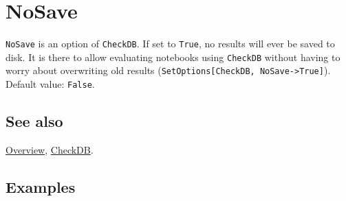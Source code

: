 \documentclass[../FeynCalcManual.tex]{subfiles}
\begin{document}
\hypertarget{nosave}{%
\section{NoSave}\label{nosave}}

\texttt{NoSave} is an option of \texttt{CheckDB}. If set to
\texttt{True}, no results will ever be saved to disk. It is there to
allow evaluating notebooks using \texttt{CheckDB} without having to
worry about overwriting old results
(\texttt{SetOptions[\allowbreak{}CheckDB,\ \allowbreak{}NoSave->True]}).
Default value: \texttt{False}.

\subsection{See also}

\hyperlink{toc}{Overview}, \hyperlink{checkdb}{CheckDB}.

\subsection{Examples}
\end{document}
